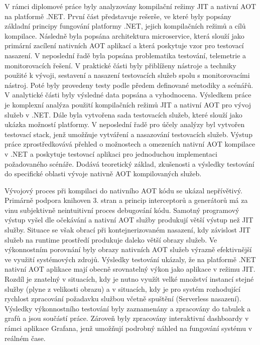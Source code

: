 
V rámci diplomové práce byly analyzovány kompilační režimy JIT a nativní AOT na platformě .NET. První část představuje rešerše, ve které byly popsány základní principy fungování platformy .NET, jejich kompilačních režimů a cílů kompilace. Následně byla popsána architektura microservice, která slouží jako primární zacílení nativních AOT aplikací a která poskytuje vzor pro testovací nasazení. V neposlední řadě byla popsána problematika testování, telemetrie a monitorovacích řešení. V praktické části byly přiblíženy nástroje a techniky použité k vývoji, sestavení a nasazení testovacích služeb spolu s monitorovacími nástroj. Poté byly provedeny testy podle předem definované metodiky a scénářů. V analytické části byly výsledné data popsána a vyhodnocena. Výsledkem práce je komplexní analýza použití kompilačních režimů JIT a nativní AOT pro vývoj služeb v .NET. Dále byla vytvořena sada testovacích služeb, které slouží jako ukázka možností platformy. V neposlední řadě pro účely analýzy byl vytvořen testovací stack, jenž umožňuje vytváření a nasazování testovacích služeb. Výstup práce zprostředkovává přehled o možnostech a omezeních nativní AOT kompilace v .NET a poskytuje testovací aplikaci pro jednoduchou implementaci požadovaného scénáře. Dodává teoretický základ, zkušenosti a výsledky testování do specifické oblasti vývoje nativně AOT kompilovaných služeb.

Vývojový proces při kompilaci do nativního AOT kódu se ukázal nepřívětivý. Primárně podpora knihoven 3. stran a princip interceptorů a generátorů má za vinu subjektivně neintuitivní proces debugování kódu. Samotný programový výstup vyšel dle očekávání a nativní AOT služby produkují větší výstup než JIT služby. Situace se však obrací při kontejnerizovaném nasazení, kdy závislost JIT služeb na runtime prostředí produkuje daleko větší obrazy služeb. Ve výkonnostním porovnání byly obrazy nativních AOT služeb výrazně efektivnější ve využití systémových zdrojů. Výsledky testování ukázaly, že na platformě .NET nativní AOT aplikace mají obecně srovnatelný výkon jako aplikace v režimu JIT. Rozdíl je znatelný v situacích, kdy je nutno využít velké množství instancí stejné služby (plyne z velikosti obrazu) a v situacích, kdy je pro systém rozhodující rychlost zpracování požadavku službou včetně spuštění (Serverless nasazení). Výsledky výkonnostního testování byly zaznamenány a zpracovány do tabulek a grafů a jsou součástí práce. Zároveň byly zpracovány interaktivní dashboardy v rámci aplikace Grafana, jenž umožňují podrobný náhled na fungování systému v reálném čase. 

